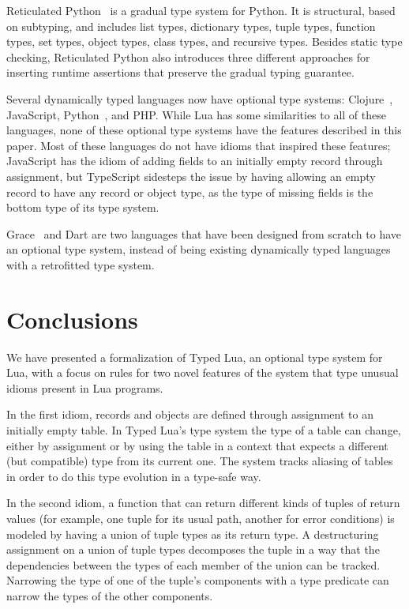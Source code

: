 \documentclass[10pt]{sigplanconf}
\begin{document}
Reticulated Python~\cite{vitousek2014deg} is a
gradual type system for Python. It is structural, based on subtyping, and includes list types,
dictionary types, tuple types, function types, set types,
object types, class types, and recursive types.
Besides static type checking, Reticulated Python also introduces
three different approaches for inserting runtime assertions
that preserve the gradual typing guarantee.

Several dynamically typed languages now have optional
type systems: Clojure~\cite{bonnaire-sergeant2015typed-clojure},
JavaScript, Python~\cite{mypy}, 
and PHP. While Lua has some similarities to
all of these languages, none of these optional type
systems have the features described in this paper.
Most of these languages do not have idioms
that inspired these features; JavaScript has the
idiom of adding fields to an initially empty
record through assignment, but TypeScript sidesteps
the issue by having allowing an empty record to
have any record or object type, as the type of
missing fields is the bottom type of its type system.

Grace~\cite{black2013sg} and Dart are
two languages that have been designed from scratch
to have an optional type system, instead of being
existing dynamically typed languages with a retrofitted 
type system. 

\section{Conclusions}
\label{sec:conclusion}

We have presented a formalization of Typed Lua,
an optional type system for Lua, with a focus on rules
for two novel features of the system that type unusual
idioms present in Lua programs.

In the first idiom, records and objects are
defined through assignment to an initially empty
table. In Typed Lua's type system the type of a
table can change, either by assignment
or by using the table in a context that expects
a different (but compatible) type from its current one.
The system tracks aliasing of tables
in order to do this type evolution in a type-safe
way.

In the second idiom, a function that can return different
kinds of tuples of return values (for example, one
tuple for its usual path, another for error conditions)
is modeled by having a union of tuple types as its return
type. A destructuring assignment on a union of tuple types
decomposes the tuple in a way that the dependencies between
the types of each member of the union can be tracked.
Narrowing the type of one of the tuple's components with
a type predicate can narrow the types of the other
components.
\end{document}
